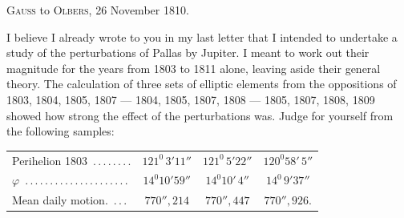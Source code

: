 \par\bigskip
{}
\begin{center}
\textsc{Gauss} to \textsc{Olbers}, 26 November 1810.
\end{center}
\noindent\hspace*{\parindent}I believe I already wrote to you in my last letter that I intended to undertake a study\HistoricalNoteEight{See p. 473 of this volume.]} of the perturbations of Pallas by Jupiter. I meant to work out their magnitude for the years from 1803 to 1811 alone, leaving aside their general theory. The calculation of three sets of elliptic elements from the oppositions of 1803, 1804, 1805, 1807 — 1804, 1805, 1807, 1808 — 1805, 1807, 1808, 1809 showed how strong the effect of the perturbations was. Judge for yourself from the following samples:
\begin{center}
\begingroup\footnotesize\setlength{\tabcolsep}{3pt}\renewcommand{\arraystretch}{1.2}
\begin{tabular}{lccc}
Perihelion 1803\ .\,.\,.\,.\,.\,.\,.\,. & \(121^{0}\,3'11''\) & \(121^{0}\,5'22''\) & \(120^{0}58'\,5''\)\\
\(\varphi\)\ .\,.\,.\,.\,.\,.\,.\,.\,.\,.\,.\,.\,.\,.\,.\,.\,.\,.\,.\,.\,. & \(14^{0}10'59''\) & \(14^{0}10'\,4''\) & \(14^{0}\,9'37''\)\\
Mean daily motion.\ .\,.\,. & \(770''{,}214\) & \(770''{,}447\) & \(770''{,}926.\)\\
\end{tabular}\endgroup
\end{center}
\par
